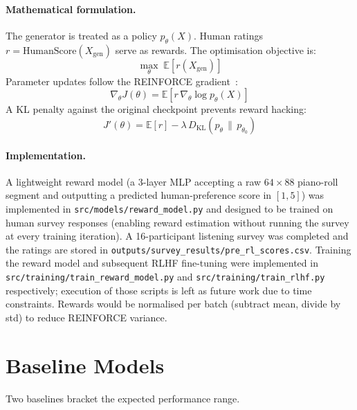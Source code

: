 \documentclass[letterpaper]{article}
\begin{document}
\paragraph{Mathematical formulation.}
The generator is treated as a policy $p_\theta(X)$.
Human ratings $r = \mathrm{HumanScore}(X_\mathrm{gen})$ serve as rewards.
The optimisation objective is:
\begin{equation}
  \max_\theta\;\mathbb{E}\!\left[r(X_\mathrm{gen})\right]
\end{equation}
Parameter updates follow the REINFORCE gradient~\cite{williams1992reinforce}:
\begin{equation}
  \nabla_\theta J(\theta) =
    \mathbb{E}\!\left[r\,\nabla_\theta \log p_\theta(X)\right]
\end{equation}
A KL penalty against the original checkpoint prevents reward hacking:
\begin{equation}
  J'(\theta) = \mathbb{E}[r]
    - \lambda\,D_{\mathrm{KL}}(p_\theta \,\|\, p_{\theta_0})
\end{equation}

\paragraph{Implementation.}
A lightweight reward model (a 3-layer MLP accepting a raw
$64 \times 88$ piano-roll segment and outputting a predicted
human-preference score in $[1,5]$) was implemented in
\texttt{src/models/reward\_model.py} and designed to be trained on
human survey responses (enabling reward estimation without running the
survey at every training iteration).  A 16-participant listening survey
was completed and the ratings are stored in
\texttt{outputs/survey\_results/pre\_rl\_scores.csv}.
Training the reward model and subsequent RLHF fine-tuning were
implemented in \texttt{src/training/train\_reward\_model.py} and
\texttt{src/training/train\_rlhf.py} respectively; execution of those
scripts is left as future work due to time constraints.
Rewards would be normalised per batch (subtract mean, divide by std)
to reduce REINFORCE variance.

\section{Baseline Models}
\label{sec:baselines}

Two baselines bracket the expected performance range.
\end{document}
